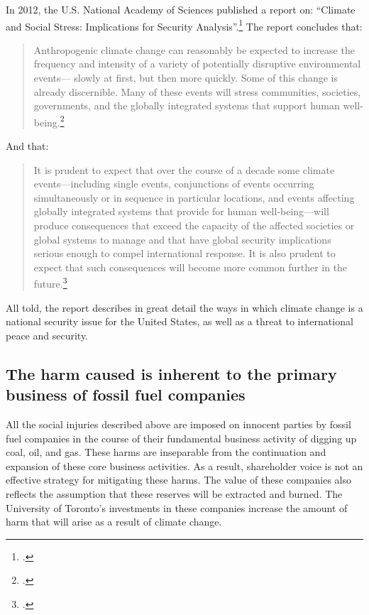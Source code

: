 In 2012, the U.S. National Academy of Sciences published a report on: ``Climate and Social Stress: Implications for Security Analysis''.\footcite[][]{SocialStress}
The report concludes that:
\begin{quote}
Anthropogenic climate change can reasonably be expected to increase the frequency and intensity of a variety of potentially disruptive environmental events— slowly at first, but then more quickly. Some of this change is already discernible. Many of these events will stress communities, societies, governments, and the globally integrated systems that support human well-being.\footcite[][p. S-2]{SocialStress}
\end{quote}
And that:
\begin{quote}
It is prudent to expect that over the course of a decade some climate events—including single events, conjunctions of events occurring simultaneously or in sequence in particular locations, and events affecting globally integrated systems that provide for human well-being—will produce consequences that exceed the capacity of the affected societies or global systems to manage and that have global security implications serious enough to compel international response. It is also prudent to expect that such consequences will become more common further in the future.\footcite[][p. S-4]{SocialStress}
\end{quote}
All told, the report describes in great detail the ways in which climate change is a national security issue for the United States, as well as a threat to international peace and security.



	\subsection{The harm caused is inherent to the primary business of fossil fuel companies}



All the social injuries described above are imposed on innocent parties by fossil fuel companies in the course of their fundamental business activity of digging up coal, oil, and gas.
These harms are inseparable from the continuation and expansion of these core business activities.
As a result, shareholder voice is not an effective strategy for mitigating these harms. 
The value of these companies also reflects the assumption that these reserves will be extracted and burned.
The University of Toronto's investments in these companies increase the amount of harm that will arise as a result of climate change.




